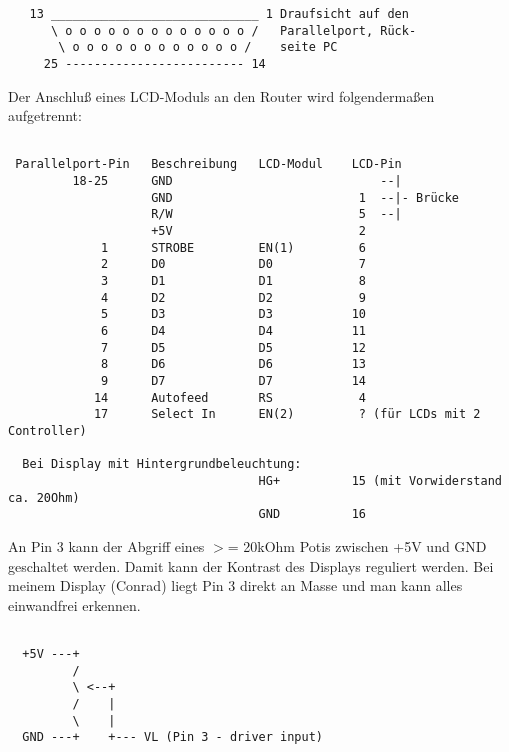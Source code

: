 \begin{example}
\begin{verbatim}
   13 _____________________________ 1 Draufsicht auf den
      \ o o o o o o o o o o o o o /   Parallelport, Rück-
       \ o o o o o o o o o o o o /    seite PC
     25 ------------------------- 14
\end{verbatim}
\end{example}
   

 Der Anschluß eines LCD-Moduls an den Router wird folgendermaßen aufgetrennt:

 
\begin{example}
\begin{verbatim}
 
 Parallelport-Pin   Beschreibung   LCD-Modul    LCD-Pin
         18-25      GND                             --|
                    GND                          1  --|- Brücke
                    R/W                          5  --|
                    +5V                          2
             1      STROBE         EN(1)         6
             2      D0             D0            7
             3      D1             D1            8
             4      D2             D2            9
             5      D3             D3           10
             6      D4             D4           11
             7      D5             D5           12
             8      D6             D6           13
             9      D7             D7           14
            14      Autofeed       RS            4
            17      Select In      EN(2)         ? (für LCDs mit 2 Controller)

  Bei Display mit Hintergrundbeleuchtung:
                                   HG+          15 (mit Vorwiderstand ca. 20Ohm)
                                   GND          16
\end{verbatim}
\end{example}

  An Pin 3 kann der Abgriff eines $>$= 20kOhm Potis zwischen +5V und GND 
  geschaltet werden. Damit kann der Kontrast des Displays reguliert werden.
  Bei meinem Display (Conrad) liegt Pin 3 direkt an Masse und man kann
  alles einwandfrei erkennen.

\begin{example}
\begin{verbatim}
  
  +5V ---+
         /
         \ <--+
         /    |
         \    |
  GND ---+    +--- VL (Pin 3 - driver input)
\end{verbatim}
\end{example}



